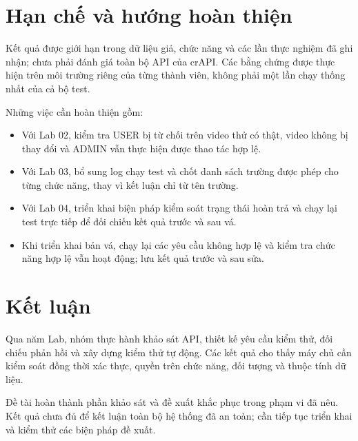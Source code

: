 \documentclass[oneside,a4paper,12pt]{extreport}
\begin{document}
\section{Hạn chế và hướng hoàn thiện}

Kết quả được giới hạn trong dữ liệu giả, chức năng và các lần thực
nghiệm đã ghi nhận; chưa phải đánh giá toàn bộ API của crAPI. Các bằng
chứng được thực hiện trên môi trường riêng của từng thành viên, không
phải một lần chạy thống nhất của cả bộ test.

Những việc cần hoàn thiện gồm:
\begin{itemize}
    \item Với Lab 02, kiểm tra USER bị từ chối trên video thử có thật,
    video không bị thay đổi và ADMIN vẫn thực hiện được thao tác hợp lệ.
    \item Với Lab 03, bổ sung log chạy test và chốt danh sách trường
    được phép cho từng chức năng, thay vì kết luận chỉ từ tên trường.
    \item Với Lab 04, triển khai biện pháp kiểm soát trạng thái hoàn trả
    và chạy lại test trực tiếp để đối chiếu kết quả trước và sau vá.
    \item Khi triển khai bản vá, chạy lại các yêu cầu không hợp lệ và
    kiểm tra chức năng hợp lệ vẫn hoạt động; lưu kết quả trước và sau sửa.
\end{itemize}

\section{Kết luận}

Qua năm Lab, nhóm thực hành khảo sát API, thiết kế yêu cầu kiểm thử,
đối chiếu phản hồi và xây dựng kiểm thử tự động. Các kết quả cho thấy
máy chủ cần kiểm soát đồng thời xác thực, quyền trên chức năng, đối
tượng và thuộc tính dữ liệu.

Đề tài hoàn thành phần khảo sát và đề xuất khắc phục trong phạm vi
đã nêu. Kết quả chưa đủ để kết luận toàn bộ hệ thống đã an toàn;
cần tiếp tục triển khai và kiểm thử các biện pháp đề xuất.
\end{document}
